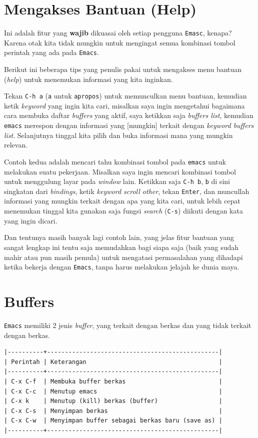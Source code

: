 \documentclass{article}
\begin{document}
\section{Mengakses Bantuan (Help)}
Ini adalah fitur yang \textbf{wajib} dikuasai oleh setiap pengguna 
\verb=Emasc=, kenapa? Karena otak kita tidak mungkin untuk mengingat
semua kombinasi tombol perintah yang ada pada \verb=Emacs=.

Berikut ini beberapa tips yang penulis pakai untuk mengakses menu bantuan
(\emph{help}) untuk menemukan informasi yang kita inginkan.

Tekan \verb=C-h a= (\verb=a= untuk \verb=apropos=) untuk memunculkan 
menu bantuan, kemudian ketik \emph{keyword} yang ingin kita cari, 
misalkan saya ingin mengetahui bagaimana cara membuka daftar 
\emph{buffers} yang aktif, saya ketikkan saja \emph{buffers list}, 
kemudian \verb=emacs= merespon dengan informasi yang [mungkin] terkait 
dengan \emph{keyword buffers list}. Selanjutnya tinggal kita pilih dan
buka informasi mana yang mungkin relevan.

Contoh kedua adalah mencari tahu kombinasi tombol pada \verb=emacs= untuk
melakukan suatu pekerjaan. Misalkan saya ingin mencari kombinasi tombol untuk
menggulung layar pada \emph{window} lain. Ketikkan saja \verb=C-h b=,
\verb=b= di sini singkatan dari \emph{bindings}, ketik 
\emph{keyword scroll other}, tekan \verb=Enter=, dan muncullah informasi
yang mungkin terkait dengan apa yang kita cari, untuk lebih cepat menemukan
tinggal kita gunakan saja fungsi \emph{search} (\verb=C-s=) diikuti dengan
kata yang ingin dicari.

Dan tentunya masih banyak lagi contoh lain, yang jelas fitur bantuan yang 
sangat lengkap ini tentu saja memudahkan bagi siapa saja (baik yang sudah
mahir atau pun masih pemula) untuk mengatasi permasalahan yang dihadapi
ketika bekerja dengan \verb=Emacs=, tanpa harus melakukan jelajah ke 
dunia maya.

\section{Buffers}
\verb=Emacs= memiliki 2 jenis \emph{buffer}, yang terkait dengan berkas dan
yang tidak terkait dengan berkas.

\begin{verbatim}
|----------+------------------------------------------------|
| Perintah | Keterangan                                     |
|----------+------------------------------------------------|
| C-x C-f  | Membuka buffer berkas                          |
| C-x C-c  | Menutup emacs                                  |
| C-x k    | Menutup (kill) berkas (buffer)                 |
| C-x C-s  | Menyimpan berkas                               |
| C-x C-w  | Menyimpan buffer sebagai berkas baru (save as) |
|----------+------------------------------------------------|
\end{verbatim}
\end{document}
